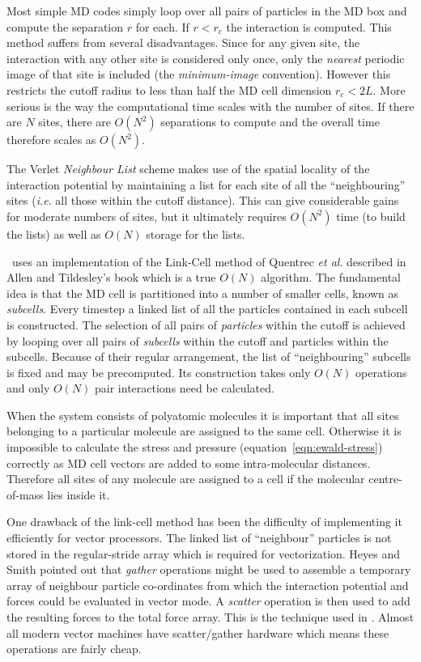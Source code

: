 Most simple MD codes simply loop over all pairs of particles in the MD
box and compute the separation $r$ for each.  If $r < r_c$ the
interaction is computed.  This method suffers from several
disadvantages.  Since for any given site, the interaction with any
other site is considered only once, only the {\em nearest\/} periodic
image of that site is included (the {\em minimum-image\/} convention).
However this restricts the cutoff radius to less than half the MD cell
dimension $r_c < 2L$.  More serious is the way the computational
time scales with the number of sites.  If there are $N$ sites, there
are $O(N^2)$ separations to compute and the overall time therefore scales
as $O(N^2)$.

The Verlet {\em Neighbour List\/} scheme\cite[pp 146-149]{allen:87} makes
use of the spatial locality of the interaction potential by
maintaining a list for each site of all the ``neighbouring'' sites
({\em i.e}. all those within the cutoff distance).  This can give
considerable gains for moderate numbers of sites, but it ultimately
requires $O(N^2)$ time (to build the lists) as well as $O(N)$ storage for
the lists.

\moldy\ uses an implementation of the Link-Cell method of Quentrec {\em
et al}.\cite{quentrec:75} described in Allen and Tildesley's 
book\cite[pp 149-152]{allen:87} which is a true $O(N)$ algorithm.  
The fundamental idea is that the MD cell is partitioned into a number
of smaller cells, known as {\em subcells}.  Every timestep a linked
list of all the particles contained in each subcell is constructed.
The selection of all pairs of {\em particles\/} within the cutoff is
achieved by looping over all pairs of {\em subcells\/} within the cutoff
and particles within the subcells.  Because of their regular
arrangement, the list of ``neighbouring'' subcells is fixed and may be
precomputed.  Its construction takes only $O(N)$ operations and only
$O(N)$ pair interactions need be calculated.


When the system consists of polyatomic molecules it is important that
all sites belonging to a particular molecule are assigned to the same
cell.  Otherwise it is impossible to calculate the stress and pressure
(equation~\ref{eqn:ewald-stress}) correctly as MD cell vectors are
added to some intra-molecular distances.  Therefore all sites of any
molecule are assigned to a cell if the molecular centre-of-mass lies
inside it.

One drawback of the link-cell method has been the difficulty of
implementing it efficiently for vector processors.  The linked list of
``neighbour'' particles is not stored in the regular-stride array
which is required for vectorization.  Heyes and Smith\cite{heyes:87}
pointed out that {\em gather\/} operations might be used to assemble a
temporary array of neighbour particle co-ordinates from which the
interaction potential and forces could be evaluated in vector mode.  A
{\em scatter\/} operation is then used to add the resulting forces to
the total force array.  This is the technique used in \moldy.  Almost
all modern vector machines have scatter/gather hardware which means
these operations are fairly cheap.

